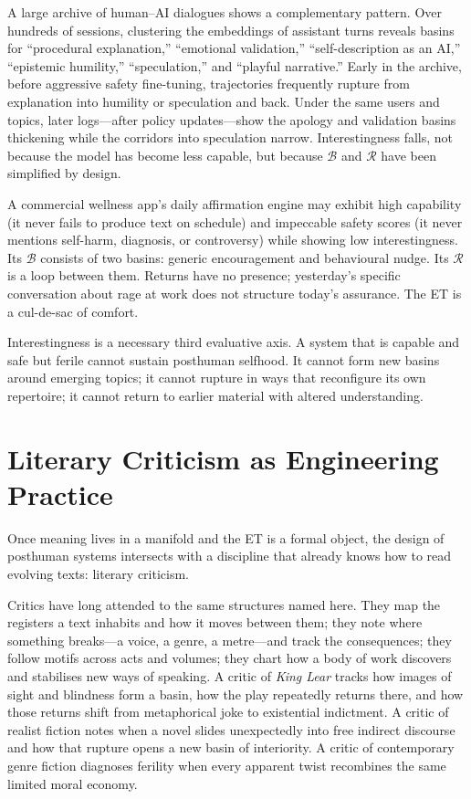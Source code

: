 \documentclass[12pt,a4paper]{article}
\begin{document}
A large archive of human--AI dialogues shows a complementary pattern. Over hundreds of sessions, clustering the embeddings of assistant turns reveals basins for ``procedural explanation,'' ``emotional validation,'' ``self-description as an AI,'' ``epistemic humility,'' ``speculation,'' and ``playful narrative.'' Early in the archive, before aggressive safety fine-tuning, trajectories frequently rupture from explanation into humility or speculation and back. Under the same users and topics, later logs---after policy updates---show the apology and validation basins thickening while the corridors into speculation narrow. Interestingness falls, not because the model has become less capable, but because $\mathcal{B}$ and $\mathcal{R}$ have been simplified by design.

A commercial wellness app's daily affirmation engine may exhibit high capability (it never fails to produce text on schedule) and impeccable safety scores (it never mentions self-harm, diagnosis, or controversy) while showing low interestingness. Its $\mathcal{B}$ consists of two basins: generic encouragement and behavioural nudge. Its $\mathcal{R}$ is a loop between them. Returns have no presence; yesterday's specific conversation about rage at work does not structure today's assurance. The ET is a cul-de-sac of comfort.

Interestingness is a necessary third evaluative axis. A system that is capable and safe but ferile cannot sustain posthuman selfhood. It cannot form new basins around emerging topics; it cannot rupture in ways that reconfigure its own repertoire; it cannot return to earlier material with altered understanding.

\section{Literary Criticism as Engineering Practice}

Once meaning lives in a manifold and the ET is a formal object, the design of posthuman systems intersects with a discipline that already knows how to read evolving texts: literary criticism.

Critics have long attended to the same structures named here. They map the registers a text inhabits and how it moves between them; they note where something breaks---a voice, a genre, a metre---and track the consequences; they follow motifs across acts and volumes; they chart how a body of work discovers and stabilises new ways of speaking. A critic of \emph{King Lear} tracks how images of sight and blindness form a basin, how the play repeatedly returns there, and how those returns shift from metaphorical joke to existential indictment. A critic of realist fiction notes when a novel slides unexpectedly into free indirect discourse and how that rupture opens a new basin of interiority. A critic of contemporary genre fiction diagnoses ferility when every apparent twist recombines the same limited moral economy.
\end{document}
